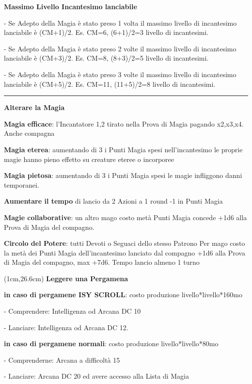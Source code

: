 \documentclass[a4paper,12 pt,openany]{book}
\newcommand{\riga}{\rule{\textwidth}{0.4pt}}
\begin{document}
\begin{textblock*}{13.5cm}
\textbf{Massimo Livello Incantesimo lanciabile}

- Se Adepto della Magia è stato preso 1 volta il massimo livello di incantesimo lanciabile è (CM+1)/2. Es. CM=6, (6+1)/2=3 livello di incantesimi.

- Se Adepto della Magia è stato preso 2 volte il massimo livello di incantesimo lanciabile è (CM+3)/2. Es. CM=8, (8+3)/2=5 livello di incantesimi.

- Se Adepto della Magia è stato preso 3 volte il massimo livello di incantesimo lanciabile è (CM+5)/2. Es. CM=11, (11+5)/2=8 livello di incantesimi.


\riga

\textbf{Alterare la Magia}

\textbf{Magia efficace}: l'Incantatore 1,2 tirato nella Prova di Magia pagando x2,x3,x4. Anche compagna

\textbf{Magia eterea}: aumentando di 3 i Punti Magia spesi nell'incantesimo le proprie magie hanno pieno effetto su creature eteree o incorporee

\textbf{Magia pietosa}: aumentando di 3 i Punti Magia spesi le magie infliggono danni temporanei.

\textbf{Aumentare il tempo} di lancio da 2 Azioni a 1 round -1 in Punti Magia

\textbf{Magie collaborative}: un altro mago costo metà Punti Magia concede +1d6 alla Prova di Magia del compagno.

\textbf{Circolo del Potere}: tutti Devoti o Seguaci dello stesso Patrono
Per mago costo la metà dei Punti Magia dell'incantesimo lanciato dal compagno +1d6 alla Prova di Magia del compagno, max +7d6. Tempo lancio almeno 1 turno

\end{textblock*}

\begin{textblock*}{19 cm}(1cm,26.6cm)
	\textbf{Leggere una Pergamena}
	
	\textbf{in caso di pergamene ISY SCROLL}: costo produzione livello*livello*160mo
	
	- Comprendere: Intelligenza od Arcana DC 10
	
	- Lanciare: Intelligenza od Arcana DC 12.
	
	\textbf{in caso di pergamene normali}: costo produzione livello*livello*80mo
	
	- Comprenderne: Arcana a difficoltà 15
	
	- Lanciare: Arcana DC 20 ed avere accesso alla Lista di Magia
\end{textblock*}


~\newpage
\end{document}
